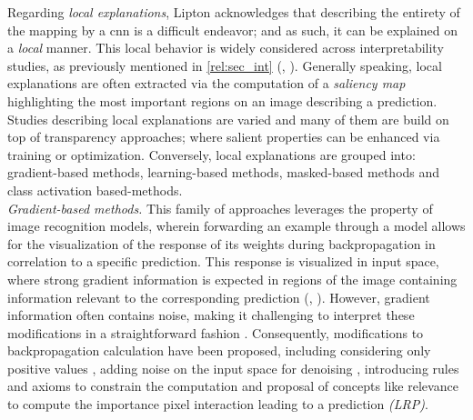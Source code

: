 \noindent Regarding \emph{local explanations}, Lipton acknowledges that describing the entirety of 
the mapping by a \gls{cnn} is a difficult endeavor; and as such, it can be explained on a 
\emph{local} manner. This local behavior is widely considered across interpretability studies, as 
previously mentioned in \autoref{rel:sec_int} (\cite{guidotti2018survey}, \cite{zhang2021survey}). 
Generally speaking, local explanations are often extracted via the computation of a \emph{saliency 
map} highlighting the most important regions on an image describing a prediction. Studies describing 
local explanations are varied and many of them are build on top of transparency approaches; where 
salient properties can be enhanced via training or optimization. Conversely, local explanations 
are grouped into: gradient-based methods, learning-based methods, masked-based methods and 
class activation based-methods.\\

\noindent \emph{Gradient-based methods.} This family of approaches leverages the property of 
image recognition models, wherein forwarding an example through a model allows for the 
visualization of the response of its weights during backpropagation in correlation to a specific 
prediction. This response is visualized in input space, where strong gradient information is 
expected in regions of the image containing information relevant to the corresponding prediction 
(\cite{baehrens2010explain}, \cite{simonyan2013deep}). However, gradient information often contains 
noise, making it challenging to interpret these modifications in a straightforward fashion 
\cite{adebayo2018local}. Consequently, modifications to backpropagation calculation have 
been proposed, including considering only positive values \autocite{guidedbackprop}, adding noise 
on the input space for denoising \autocite{smilkov2017smoothgrad}, introducing rules and axioms to 
constrain the computation \autocite{sundararajan2017axiomatic} and proposal of concepts like 
relevance \autocite{bach2015pixel} to compute the importance pixel interaction leading to a 
prediction \emph{(LRP)}.\\

